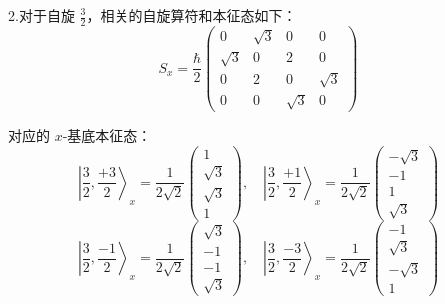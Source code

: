 2.对于自旋 \( \frac{3}{2} \)，相关的自旋算符和本征态如下：
\[
S_x = \frac{\hbar}{2}
\begin{pmatrix}
0 & \sqrt{3} & 0 & 0 \\
\sqrt{3} & 0 & 2 & 0 \\
0 & 2 & 0 & \sqrt{3} \\
0 & 0 & \sqrt{3} & 0
\end{pmatrix}~
\]

对应的 \( x \)-基底本征态：
\[
\left| \frac{3}{2}, \frac{+3}{2} \right\rangle_x = \frac{1}{2\sqrt{2}}
\begin{pmatrix}
1 \\
\sqrt{3} \\
\sqrt{3} \\
1
\end{pmatrix},
\quad
\left| \frac{3}{2}, \frac{+1}{2} \right\rangle_x = \frac{1}{2\sqrt{2}}
\begin{pmatrix}
- \sqrt{3} \\
-1 \\
1 \\
\sqrt{3}
\end{pmatrix}~
\]
\[
\left| \frac{3}{2}, \frac{-1}{2} \right\rangle_x = \frac{1}{2\sqrt{2}}
\begin{pmatrix}
\sqrt{3} \\
-1 \\
-1 \\
\sqrt{3}
\end{pmatrix},
\quad
\left| \frac{3}{2}, \frac{-3}{2} \right\rangle_x = \frac{1}{2\sqrt{2}}
\begin{pmatrix}
-1 \\
\sqrt{3} \\
-\sqrt{3} \\
1
\end{pmatrix}~
\]


